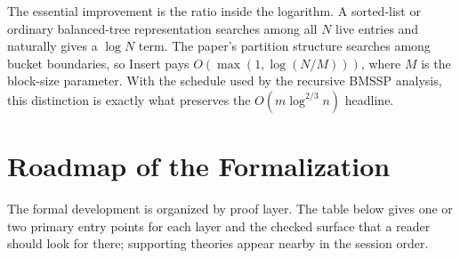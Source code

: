 \documentclass[11pt,a4paper]{article}
\begin{document}
The essential improvement is the ratio inside the logarithm.  A sorted-list
or ordinary balanced-tree representation searches among all \(N\) live
entries and naturally gives a \(\log N\) term.  The paper's partition
structure searches among bucket boundaries, so Insert pays
\(O(\max(1,\log(N/M)))\), where \(M\) is the block-size parameter.  With the
schedule used by the recursive BMSSP analysis, this distinction is exactly
what preserves the \(O(m \log^{2/3} n)\) headline.

\section{Roadmap of the Formalization}

The formal development is organized by proof layer.  The table below gives one
or two primary entry points for each layer and the checked surface that a
reader should look for there; supporting theories appear nearby in the session
order.
\end{document}
